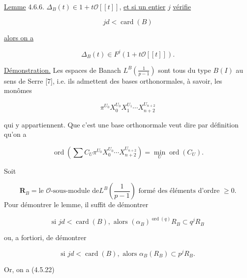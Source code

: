 \underline{Lemme} 4.6.6.
$\Delta_B(t)\in1+t\mathcal O[[t]]$, \underline{et si un entier} $j$ \underline{vérifie}

\begin{equation}\tag{4.6.7}
jd<\operatorname{card}(B)
\end{equation}

\underline{alors on a}

\begin{equation}\tag{4.6.8}
\Delta_B(t)\in F^j(1+t\mathcal O[[t]]).
\end{equation}


\underline{Démonstration.}
Les espaces de Banach
$L^B\!\left(\frac1{p-1}\right)$ sont tous \og du type $B(I)$\fg{} au sens de
Serre [7], i.e. ils admettent des \og bases orthonormales\fg{}, à savoir, les
monômes

\begin{equation}\tag{4.6.9}
\pi^{U_0}X_0^{U_0}X_1^{U_1}\cdots X_{n+2}^{U_{n+2}}
\end{equation}

\noindent
qui y appartiennent. Que c'est une base \og orthonormale\fg{} veut dire par
définition qu'on a

\begin{equation}\tag{4.6.10}
\operatorname{ord}\!\left(
\sum C_U\pi^{U_0}X_0^{U_0}\cdots X_{n+2}^{U_{n+2}}
\right)
=\min_U\operatorname{ord}(C_U).
\end{equation}

Soit

\begin{equation}\tag{4.6.11}
\mathbf R_B=\text{le $\mathcal O$-sous-module de
$L^B\!\left(\frac1{p-1}\right)$ formé des éléments d'ordre $\geq0$}.
\end{equation}
Pour démontrer le lemme, il suffit de démontrer

\begin{equation}\tag{4.6.12}
\text{si }jd<\operatorname{card}(B),\text{ alors }
(\alpha_B)^{\operatorname{ord}(q)}R_B\subset q^jR_B
\end{equation}

ou, a fortiori, de démontrer

\begin{equation}\tag{4.6.13}
\text{si }jd<\operatorname{card}(B),\text{ alors }
\alpha_B(R_B)\subset p^jR_B.
\end{equation}

Or, on a (4.5.22)

